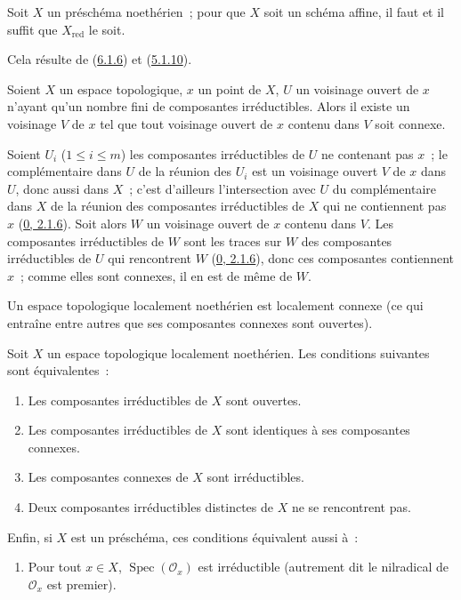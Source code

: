 \begin{corollary}[6.1.7]
\label{I.6.1.7-fr}
Soit $X$ un préschéma noethérien~; pour que $X$ soit un schéma affine, il faut
et il suffit que $X_{\mathrm{red}}$ le soit.
\end{corollary}

Cela résulte de (\hyperref[I.6.1.6-fr]{6.1.6}) et
(\hyperref[I.5.1.10-fr]{5.1.10}).

\begin{lemma}[6.1.8]
\label{I.6.1.8-fr}
Soient $X$ un espace topologique, $x$ un point de $X$, $U$ un voisinage ouvert
de $x$ n'ayant qu'un nombre fini de composantes irréductibles. Alors il existe
un voisinage $V$ de $x$ tel que tout voisinage ouvert de $x$ contenu dans $V$
soit connexe.
\end{lemma}

Soient $U_i$ ($1\leq i\leq m$) les composantes irréductibles de $U$ ne
contenant pas $x$~; le complémentaire dans $U$ de la réunion des $U_i$ est un
voisinage ouvert $V$ de $x$ dans $U$, donc aussi dans $X$~; c'est d'ailleurs
l'intersection avec $U$ du complémentaire dans $X$ de la réunion des composantes irréductibles de $X$
qui ne contiennent pas $x$ (\hyperref[0.2.1.6-fr]{0, 2.1.6}). Soit alors $W$
un voisinage ouvert de $x$ contenu dans $V$. Les composantes irréductibles de
$W$ sont les traces sur $W$ des composantes irréductibles de $U$ qui
rencontrent $W$ (\hyperref[0.2.1.6-fr]{0, 2.1.6}), donc ces composantes
contiennent $x$~; comme elles sont connexes, il en est de même de $W$.

\begin{corollary}[6.1.9]
\label{I.6.1.9-fr}
Un espace topologique localement noethérien est localement connexe (ce qui
entraîne entre autres que ses composantes connexes sont ouvertes).
\end{corollary}

\begin{proposition}[6.1.10]
\label{I.6.1.10-fr}
Soit $X$ un espace topologique localement noethérien. Les conditions suivantes
sont équivalentes~:
\begin{enumerate}
  \item[a)] Les composantes irréductibles de $X$ sont ouvertes.
  \item[b)] Les composantes irréductibles de $X$ sont identiques à ses
    composantes connexes.
  \item[c)] Les composantes connexes de $X$ sont irréductibles.
  \item[d)] Deux composantes irréductibles distinctes de $X$ ne se rencontrent
    pas.
\end{enumerate}

Enfin, si $X$ est un préschéma, ces conditions équivalent aussi à~:
\begin{enumerate}
  \item[e)] Pour tout $x\in X$, $\operatorname{Spec}(\mathscr{O}_x)$ est
    irréductible (autrement dit le nilradical de $\mathscr{O}_x$ est premier).
\end{enumerate}
\end{proposition}

